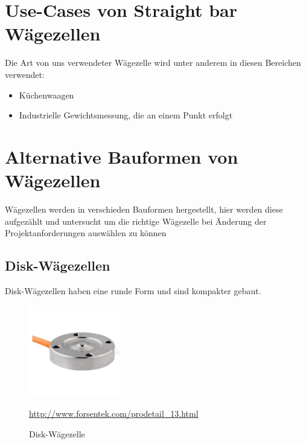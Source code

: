 \section{Use-Cases von Straight bar Wägezellen}
Die Art von uns verwendeter Wägezelle wird unter anderem in diesen Bereichen verwendet:
\begin{itemize}
    \item Küchenwaagen
    \item Industrielle Gewichtsmessung, die an einem Punkt erfolgt
\end{itemize}
\newpage
\section{Alternative Bauformen von Wägezellen}
Wägezellen werden in verschieden Bauformen hergestellt, hier werden diese aufgezählt und untersucht um die richtige Wägezelle bei Änderung der Projektanforderungen auswählen zu können
\subsection{Disk-Wägezellen}
Disk-Wägezellen haben eine runde Form und sind kompakter gebaut.
\begin{figure}[ht]
    \center
    \includegraphics[width=4cm]{Bilder/waegezelle-disk.jpg}\\
    \caption{Disk-Wägezelle}
    \begin{center} \quelle\url{http://www.forsentek.com/prodetail_13.html} \end{center}
\end{figure}
\newpage
